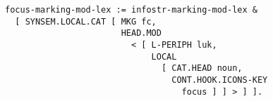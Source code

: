 \documentclass[a4paper]{article}
\begin{document}
{\small\begin{verbatim}
focus-marking-mod-lex := infostr-marking-mod-lex &
  [ SYNSEM.LOCAL.CAT [ MKG fc,
                       HEAD.MOD 
                         < [ L-PERIPH luk,
                             LOCAL 
                               [ CAT.HEAD noun,
                                 CONT.HOOK.ICONS-KEY 
                                   focus ] ] > ] ].
\end{verbatim}}
\end{document}
